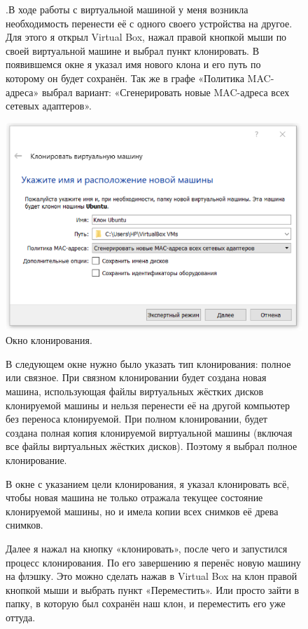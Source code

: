 \begin{figure}
.\quad В ходе работы с виртуальной машиной у меня возникла необходимость перенести её с одного своего устройства на другое.
\newline Для этого я открыл Virtual Box, нажал правой кнопкой мыши по своей виртуальной машине и выбрал пункт клонировать. В появившемся окне я указал имя нового клона и его путь по которому он будет сохранён. Так же в графе «Политика MAC-адреса» выбрал вариант: «Сгенерировать новые MAC-адреса всех сетевых адаптеров».

		\centering
		\includegraphics[width=0.6\linewidth]{img/8.png}
\caption{Окно клонирования.}
\label{ris:image}
\end{figure}

\begin{figure}
\quad В следующем окне нужно было указать тип клонирования: полное или связное. При связном клонировании будет создана новая машина, использующая файлы виртуальных жёстких дисков клонируемой машины и нельзя перенести её на другой компьютер без переноса клонируемой. При полном клонировании, будет создана полная копия клонируемой виртуальной машины (включая все файлы виртуальных жёстких дисков). Поэтому я выбрал полное клонирование.
\end{figure}

\begin{figure}
\quad В окне с указанием цели клонирования, я указал клонировать всё, чтобы новая машина не только отражала текущее состояние клонируемой машины, но и имела копии всех снимков её древа снимков.
\end{figure}

\begin{figure}
\quad Далее я нажал на кнопку «клонировать», после чего и запустился процесс клонирования. По его завершению я перенёс новую машину на флэшку. Это можно сделать нажав в Virtual Box на клон правой кнопкой мыши и выбрать пункт «Переместить». Или просто зайти в папку, в которую был сохранён наш клон, и переместить его уже оттуда.
\end{figure}

